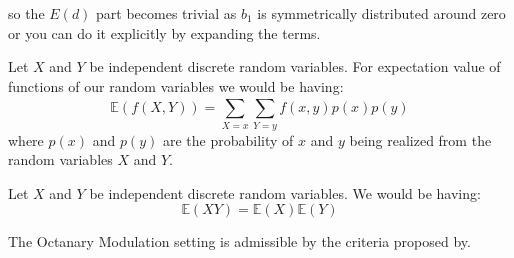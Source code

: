 		
so the $E(d)$ part becomes trivial as $b_1$ is symmetrically distributed around zero or you can do it explicitly by expanding the terms. 


\begin{Thm}\label{theorem:expectation_general}
  Let $X$ and $Y$ be independent discrete random variables. For expectation value of functions of our random variables we would be having:
\begin{equation}
  \mathbb{E}(f(X,Y)) = \sum_{X=x}^{}\sum_{Y=y}^{}f(x,y)p(x)p(y)
\end{equation}
  where $p(x)$ and $p(y)$ are the probability of $x$ and $y$ being realized from the random variables $X$ and $Y$.
\end{Thm}
\begin{Lem}\label{lemma:expectation_multiplication}
Let $X$ and $Y$ be independent discrete random variables. We would be having:
\begin{equation}
  \mathbb{E}(XY) = \mathbb{E}(X)\mathbb{E}(Y)
\end{equation}
\end{Lem}


\begin{Prop}
	The Octanary Modulation setting is admissible by the criteria proposed by\cite{Candes2014}. 
\end{Prop}

